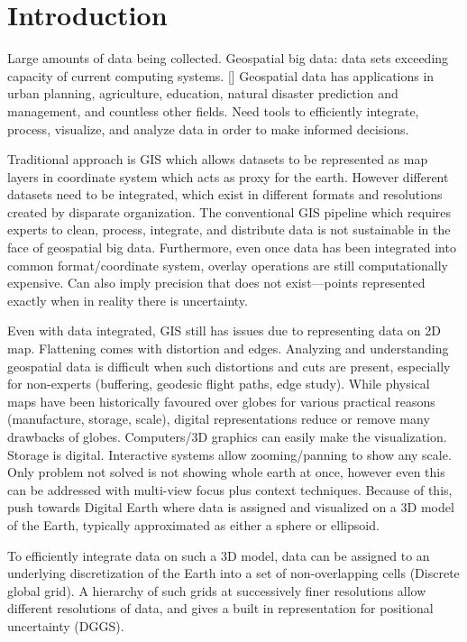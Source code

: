 \chapter{Introduction}


Large amounts of data being collected. Geospatial big data: data sets exceeding capacity of current computing systems. [] Geospatial data has applications in urban planning, agriculture, education, natural disaster prediction and management, and countless other fields. Need tools to efficiently integrate, process, visualize, and analyze data in order to make informed decisions.

Traditional approach is GIS which allows datasets to be represented as map layers in coordinate system which acts as proxy for the earth. However different datasets need to be integrated, which exist in different formats and resolutions created by disparate organization. The conventional GIS pipeline which requires experts to clean, process, integrate, and distribute data is not sustainable in the face of geospatial big data. Furthermore, even once data has been integrated into common format/coordinate system, overlay operations are still computationally expensive. Can also imply precision that does not exist---points represented exactly when in reality there is uncertainty. 

Even with data integrated, GIS still has issues due to representing data on 2D map. Flattening comes with distortion and edges. Analyzing and understanding geospatial data is difficult when such distortions and cuts are present, especially for non-experts (buffering, geodesic flight paths, edge study). While physical maps have been historically favoured over globes for various practical reasons (manufacture, storage, scale), digital representations reduce or remove many drawbacks of globes. Computers/3D graphics can easily make the visualization. Storage is digital. Interactive systems allow zooming/panning to show any scale. Only problem not solved is not showing whole earth at once, however even this can be addressed with multi-view focus plus context techniques. Because of this, push towards Digital Earth where data is assigned and visualized on a 3D model of the Earth, typically approximated as either a sphere or ellipsoid.

To efficiently integrate data on such a 3D model, data can be assigned to an underlying discretization of the Earth into a set of non-overlapping cells (Discrete global grid). A hierarchy of such grids at successively finer resolutions allow different resolutions of data, and gives a built in representation for positional uncertainty (DGGS). 

